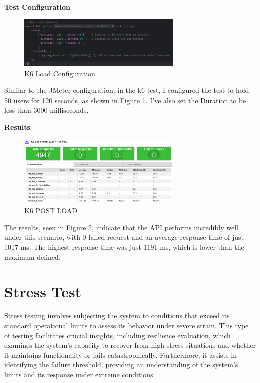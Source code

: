 \documentclass[a4paper,11pt,openright,BCOR=15mm]{scrbook}
\begin{document}
		\textbf{Test Configuration}
		\begin{figure}[H]
			\centering
			\includegraphics[width=0.7\textwidth]{figs/Performance/Test Configuration/K6-LOAD.png}
			\caption{K6 Load Configuration}
			\label{fig:K6-LOAD-POST}
		\end{figure}
		Similar to the JMeter configuration, in the k6 test, I configured the test to hold 50 users for 120 seconds, as shown in Figure \ref{fig:K6-LOAD-POST}. I've also set the Duration to be less than 3000 milliseconds.

		\textbf{Results}
		\begin{figure}[H]
			\centering
			\includegraphics[width=0.7\textwidth]{figs/Performance/Results/K6 POST LOAD.png}
			\caption{K6 POST LOAD}
			\label{fig:K6-POST-LOAD}
		\end{figure}
		The results, seen in Figure \ref{fig:K6-POST-LOAD}, indicate that the API performs incredibly well under this scenario, with 0 failed request and an average response time of just 1017 ms. The highest response time was just 1191 ms, which is lower than the maximum defined.

\section{Stress Test}
		
	Stress testing involves subjecting the system to conditions that exceed its standard operational limits to assess its behavior under severe strain. This type of testing facilitates
crucial insights, including resilience evaluation, which examines the system’s capacity
to recover from high-stress situations and whether it maintains functionality or fails
catastrophically. Furthermore, it assists in identifying the failure threshold, providing
an understanding of the system’s limits and its response under extreme conditions.
		
\end{document}
